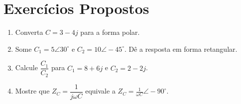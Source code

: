 \section{Exercícios Propostos}
\begin{enumerate}
  \item Converta \(C=3-4j\) para a forma polar.
  \item Some \(C_{1}=5\angle30^{\circ}\) e \(C_{2}=10\angle-45^{\circ}\). Dê a resposta em forma retangular.
  \item Calcule \(\dfrac{C_{1}}{C_{2}}\) para \(C_{1}=8+6j\) e \(C_{2}=2-2j\).
  \item Mostre que \(Z_{C}=\dfrac{1}{j\omega C}\) equivale a \(Z_{C}=\frac{1}{\omega C}\angle-90^{\circ}\).
\end{enumerate}
